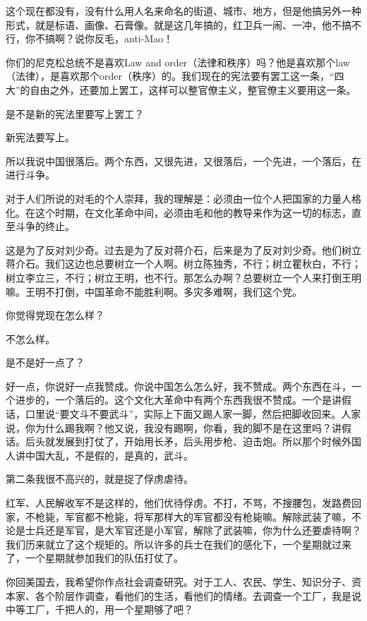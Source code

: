 这个现在都没有，没有什么用人名来命名的街道、城市、地方，但是他搞另外一种形式，就是标语、画像、石膏像。就是这几年搞的，红卫兵一闹、一冲，他不搞不行，你不搞啊？说你反毛，anti-Mao！

你们的尼克松总统不是喜欢Law and order（法律和秩序）吗？他是喜欢那个law（法律），是喜欢那个order（秩序）的。我们现在的宪法要有罢工这一条，“四大”的自由之外，还要加上罢工，这样可以整官僚主义，整官僚主义要用这一条。

是不是新的宪法里要写上罢工？

新宪法要写上。

所以我说中国很落后。两个东西，又很先进，又很落后，一个先进，一个落后，在进行斗争。

对于人们所说的对毛的个人崇拜，我的理解是：必须由一位个人把国家的力量人格化。在这个时期，在文化革命中间，必须由毛和他的教导来作为这一切的标志，直至斗争的终止。

这是为了反对刘少奇。过去是为了反对蒋介石，后来是为了反对刘少奇。他们树立蒋介石。我们这边也总要树立一个人啊。树立陈独秀，不行；树立瞿秋白，不行；树立李立三，不行；树立王明，也不行。那怎么办啊？总要树立一个人来打倒王明嘛。王明不打倒，中国革命不能胜利啊。多灾多难啊，我们这个党。

你觉得党现在怎么样？

不怎么样。

是不是好一点了？

好一点，你说好一点我赞成。你说中国怎么怎么好，我不赞成。两个东西在斗，一个进步的，一个落后的。这个文化大革命中有两个东西我很不赞成。一个是讲假话，口里说“要文斗不要武斗”，实际上下面又踢人家一脚，然后把脚收回来。人家说，你为什么踢我啊？他又说，我没有踢啊，你看，我的脚不是在这里吗？讲假话。后头就发展到打仗了，开始用长矛，后头用步枪、迫击炮。所以那个时候外国人讲中国大乱，不是假的，是真的，武斗。

第二条我很不高兴的，就是捉了俘虏虐待。

红军、人民解收军不是这样的，他们优待俘虏。不打，不骂，不搜腰包，发路费回家，不枪毙，军官都不枪毙，将军那样大的军官都没有枪毙嘛。解除武装了嘛，不论是士兵还是军官，是大军官还是小军官，解除了武装嘛，你为什么还要虐待啊？我们历来就立了这个规矩的。所以许多的兵士在我们的感化下，一个星期就过来了，一个星期就参加我们的队伍打仗了。

你回美国去，我希望你作点社会调查研究。对于工人、农民、学生、知识分子、资本家、各个阶层作调查，看他们的生活，看他们的情绪。去调查一个工厂，我是说中等工厂，千把人的，用一个星期够了吧？


